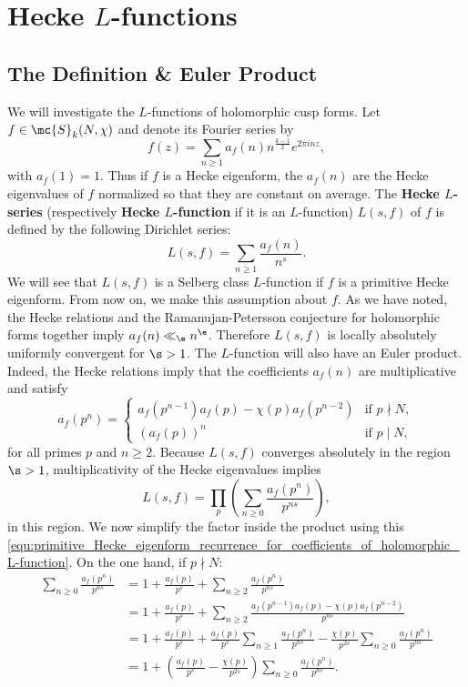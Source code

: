   \section{Hecke \texorpdfstring{$L$}{L}-functions}
    \subsection*{The Definition \& Euler Product}
      We will investigate the $L$-functions of holomorphic cusp forms. Let $f \in \mc{S}_{k}(N,\chi)$ and denote its Fourier series by
      \[
        f(z) = \sum_{n \ge 1}a_{f}(n)n^{\frac{k-1}{2}}e^{2\pi inz},
      \]
      with $a_{f}(1) = 1$. Thus if $f$ is a Hecke eigenform, the $a_{f}(n)$ are the Hecke eigenvalues of $f$ normalized so that they are constant on average. The \textbf{Hecke $L$-series} (respectively \textbf{Hecke $L$-function} if it is an $L$-function) $L(s,f)$ of $f$ is defined by the following Dirichlet series:
      \[
        L(s,f) = \sum_{n \ge 1}\frac{a_{f}(n)}{n^{s}}.
      \]
      We will see that $L(s,f)$ is a Selberg class $L$-function if $f$ is a primitive Hecke eigenform. From now on, we make this assumption about $f$. As we have noted, the Hecke relations and the Ramanujan-Petersson conjecture for holomorphic forms together imply $a_{f}(n) \ll_{\e} n^{\e}$. Therefore $L(s,f)$ is locally absolutely uniformly convergent for $\s > 1$. The $L$-function will also have an Euler product. Indeed, the Hecke relations imply that the coefficients $a_{f}(n)$ are multiplicative and satisfy
      \begin{equation}\label{equ:primitive_Hecke_eigenform_recurrence_for_coefficients_of_holomorphic_L-function}
        a_{f}(p^{n}) = \begin{cases} a_{f}(p^{n-1})a_{f}(p)-\chi(p)a_{f}(p^{n-2}) & \text{if $p \nmid N$}, \\ (a_{f}(p))^{n} & \text{if $p \mid N$}, \end{cases}
      \end{equation}
      for all primes $p$ and $n \ge 2$. Because $L(s,f)$ converges absolutely in the region $\s > 1$, multiplicativity of the Hecke eigenvalues implies
      \[
        L(s,f) = \prod_{p}\left(\sum_{n \ge 0}\frac{a_{f}(p^{n})}{p^{ns}}\right),
      \]
      in this region. We now simplify the factor inside the product using this \cref{equ:primitive_Hecke_eigenform_recurrence_for_coefficients_of_holomorphic_L-function}. On the one hand, if $p \nmid N$:
      \begin{align*}
        \sum_{n \ge 0}\frac{a_{f}(p^{n})}{p^{ns}} &= 1+\frac{a_{f}(p)}{p^{s}}+\sum_{n \ge 2}\frac{a_{f}(p^{n})}{p^{ns}} \\
        &= 1+\frac{a_{f}(p)}{p^{s}}+\sum_{n \ge 2}\frac{a_{f}(p^{n-1})a_{f}(p)-\chi(p)a_{f}(p^{n-2})}{p^{ns}} \\
        &= 1+\frac{a_{f}(p)}{p^{s}}+\frac{a_{f}(p)}{p^{s}}\sum_{n \ge 1}\frac{a_{f}(p^{n})}{p^{ns}}-\frac{\chi(p)}{p^{2s}}\sum_{n \ge 0}\frac{a_{f}(p^{n})}{p^{ns}} \\
        &= 1+\left(\frac{a_{f}(p)}{p^{s}}-\frac{\chi(p)}{p^{2s}}\right)\sum_{n \ge 0}\frac{a_{f}(p^{n})}{p^{ns}}.
      \end{align*}
